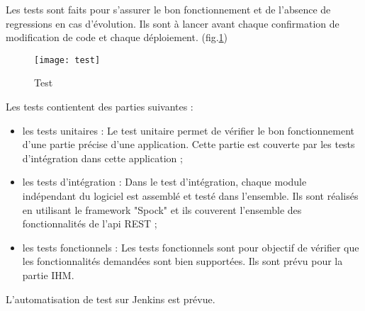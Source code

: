Les tests sont faits pour s'assurer le bon fonctionnement et de l'absence de regressions en cas d'évolution.
Ils sont à lancer avant chaque confirmation de modification de code et chaque déploiement. (fig.\ref{fig:test})

\begin{figure}[ht]
 \centering
 \texttt{[image: test]}
 \caption{Test}
 \label{fig:test}
\end{figure}

Les tests contientent des parties suivantes :
\begin{itemize}
 \item les tests unitaires :
       Le test unitaire permet de vérifier le bon fonctionnement d'une partie précise d'une application.
       Cette partie est couverte par les tests d'intégration dans cette application ;
 \item les tests d'intégration :
       Dans le test d’intégration, chaque module indépendant du logiciel est assemblé et testé dans l’ensemble.
       Ils sont réalisés en utilisant le framework "Spock" et ils couverent l'ensemble des fonctionnalités de l'api REST ;
 \item les tests fonctionnels :
       Les tests fonctionnels sont pour objectif de  vérifier que les fonctionnalités demandées sont bien supportées.
       Ils sont prévu pour la partie IHM.
\end{itemize}

L'automatisation de test sur Jenkins est prévue.

\clearpage
